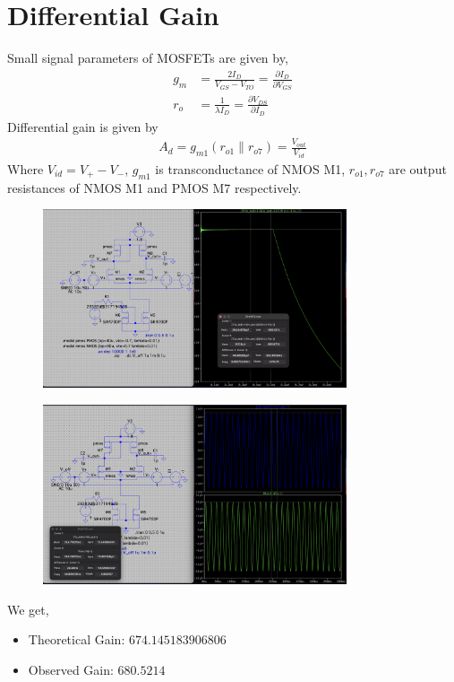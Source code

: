 \documentclass[12pt,a4paper]{article}
\begin{document}
\section{Differential Gain}
Small signal parameters of MOSFETs are given by,
\begin{align*}
    g_m &= \frac{2I_D}{V_{GS}-V_{TO}} = \frac{\partial I_D}{\partial V_{GS}}\\
    r_o &= \frac{1}{\lambda I_D} =  \frac{\partial V_{DS}}{\partial I_D}
\end{align*}
Differential gain is given by 
\begin{align*}
    A_d = g_{m1} (r_{o1} \parallel r_{o7}) = \frac{V_{out}}{V_{id}}
\end{align*}
Where $V_{id}=V_+-V_-$, $g_{m1}$ is transconductance of NMOS M1, $r_{o1}, r_{o7}$ are output resistances of NMOS M1 and PMOS M7 respectively.\newline
\begin{figure}[H]
    \centering
    \includegraphics[width=0.8\textwidth]{figs/gain_1.png}
\end{figure}
\vspace{6pt}
\begin{figure}[H]
    \centering
    \includegraphics[width=0.8\textwidth]{figs/gain_2.png}
\end{figure}
We get,
\begin{itemize}
    \item Theoretical Gain: $674.145183906806$
    \item Observed Gain: $680.5214$
\end{itemize}
\vspace{10pt}
\end{document}
